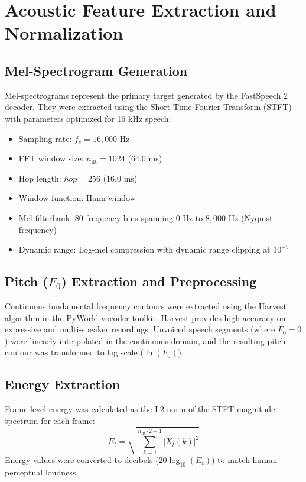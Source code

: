 \documentclass[11pt,a4paper]{article}
\begin{document}
\section{Acoustic Feature Extraction and Normalization}

\subsection{Mel-Spectrogram Generation}
Mel-spectrograms represent the primary target generated by the FastSpeech 2 decoder. They were extracted using the Short-Time Fourier Transform (STFT) with parameters optimized for 16 kHz speech:
\begin{itemize}
    \item Sampling rate: $f_s = 16,000\text{ Hz}$
    \item FFT window size: $n_{\text{fft}} = 1024$ ($64.0\text{ ms}$)
    \item Hop length: $hop = 256$ ($16.0\text{ ms}$)
    \item Window function: Hann window
    \item Mel filterbank: 80 frequency bins spanning $0\text{ Hz}$ to $8,000\text{ Hz}$ (Nyquist frequency)
    \item Dynamic range: Log-mel compression with dynamic range clipping at $10^{-5}$
\end{itemize}

\subsection{Pitch ($F_0$) Extraction and Preprocessing}
Continuous fundamental frequency contours were extracted using the Harvest algorithm in the PyWorld vocoder toolkit. Harvest provides high accuracy on expressive and multi-speaker recordings. Unvoiced speech segments (where $F_0 = 0$) were linearly interpolated in the continuous domain, and the resulting pitch contour was transformed to log scale ($\ln(F_0)$).

\subsection{Energy Extraction}
Frame-level energy was calculated as the L2-norm of the STFT magnitude spectrum for each frame:
\begin{equation}
    E_t = \sqrt{\sum_{k=1}^{n_{\text{fft}}/2+1} |X_t(k)|^2}
\end{equation}
Energy values were converted to decibels ($20 \log_{10}(E_t)$) to match human perceptual loudness.
\end{document}
